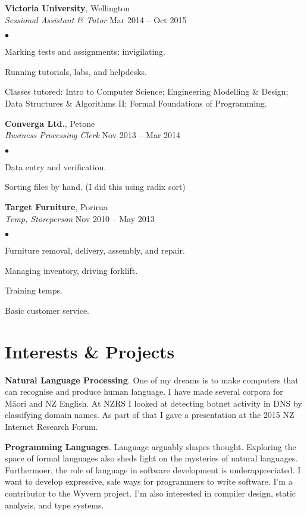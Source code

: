 \documentclass[margin,line]{res}
\newenvironment{list2}{
  \begin{list}{$\bullet$}{%
      \setlength{\itemsep}{0in}
      \setlength{\parsep}{0in} \setlength{\parskip}{0in}
      \setlength{\topsep}{0in} \setlength{\partopsep}{0in}
      \setlength{\leftmargin}{0.2in}}}
  {\end{list}}
\begin{document}
\begin{resume}
    {\bf Victoria University}, Wellington\\
    {\em Sessional Assistant \& Tutor} \hfill {Mar 2014 -- Oct 2015}
    \begin{list2}
	\item Marking tests and assignments; invigilating.
	\item Running tutorials, labs, and helpdesks.
	\item Classes tutored: Intro to Computer Science; Engineering Modelling \& Design; Data Structures \& Algorithms II; Formal Foundations of Programming.
    \end{list2}

  {\bf Converga Ltd.}, Petone\\
  {\em Business Processing Clerk} \hfill {Nov 2013 -- Mar 2014}
  \begin{list2} %
	\item Data entry and verification.
	\item Sorting files by hand. (I did this using radix sort)
  \end{list2}

  {\bf Target Furniture}, Porirua\\
  {\em Temp, Storeperson} \hfill{Nov 2010 -- May 2013}
  \begin{list2} %
	\item Furniture removal, delivery, assembly, and repair. 
	\item Managing inventory, driving forklift.
	\item Training temps.
	\item Basic customer service.
  \end{list2}


\section{\sc Interests \& Projects}

{\bf Natural Language Processing}. One of my dreams is to make computers that can recognise and produce human language. I have made several corpora for M\=aori and NZ English. At NZRS I looked at detecting botnet activity in DNS by classifying domain names. As part of that I gave a presentation at the 2015 NZ Internet Research Forum.

{\bf Programming Languages}. Language arguably shapes thought. Exploring the space of formal languages also sheds light on the mysteries of natural languages. Furthermoer, the role of language in software development is underappreciated. I want to develop expressive, safe ways for programmers to write software. I'm a contributor to the Wyvern project. I'm also interested in compiler design, static analysis, and type systems.


\end{resume}
\end{document}
